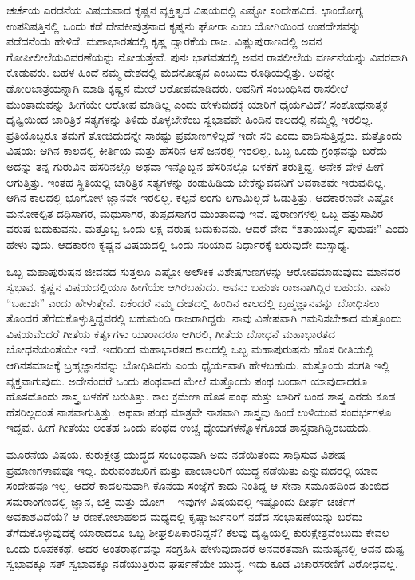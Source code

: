 \vskip 0.5cm

ಚರ್ಚೆಯ ಎರಡನೆಯ ವಿಷಯವಾದ ಕೃಷ್ಣನ ವ್ಯಕ್ತಿತ್ವದ ವಿಷಯದಲ್ಲಿ ಎಷ್ಟೋ ಸಂದೇಹವಿದೆ. ಛಾಂದೋಗ್ಯ ಉಪನಿಷತ್ತಿನಲ್ಲಿ ಒಂದು ಕಡೆ ದೇವಕೀಪುತ್ರನಾದ ಕೃಷ್ಣನು ಘೋರಾ ಎಂಬ ಯೋಗಿಯಿಂದ ಉಪದೇಶವನ್ನು ಪಡೆದನೆಂದು ಹೇಳಿದೆ. ಮಹಾ\-ಭಾರತದಲ್ಲಿ ಕೃಷ್ಣ ದ್ವಾರಕೆಯ ರಾಜ. ವಿಷ್ಣುಪುರಾಣದಲ್ಲಿ ಅವನ ಗೋಪೀಲೀಲೆಯ\break ವಿವರಣೆಯನ್ನು ನೋಡುತ್ತೇವೆ. ಪುನಃ ಭಾಗವತದಲ್ಲಿ ಅವನ ರಾಸಲೀಲೆಯ ವರ್ಣನೆಯನ್ನು ವಿವರವಾಗಿ ಕೊಡುವರು. ಬಹಳ ಹಿಂದೆ ನಮ್ಮ ದೇಶದಲ್ಲಿ ಮದನೋತ್ಸವ ಎಂಬುದು ರೂಢಿಯಲ್ಲಿತ್ತು. ಅದನ್ನೇ ಡೋಲಜಾತ್ರೆಯನ್ನಾಗಿ ಮಾಡಿ ಕೃಷ್ಣನ ಮೇಲೆ ಆರೋಪಮಾಡಿದರು. ಅವನಿಗೆ ಸಂಬಂಧಿಸಿದ ರಾಸಲೀಲೆ ಮುಂತಾದುವನ್ನು ಹೀಗೆಯೇ ಆರೋಪ ಮಾಡಿಲ್ಲ ಎಂದು ಹೇಳುವುದಕ್ಕೆ ಯಾರಿಗೆ ಧೈರ್ಯವಿದೆ? ಸಂಶೋಧನಾತ್ಮಕ ದೃಷ್ಟಿಯಿಂದ ಚಾರಿತ್ರಿಕ ಸತ್ಯಗಳನ್ನು ತಿಳಿದು ಕೊಳ್ಳಬೇಕೆಂಬ ಸ್ವಭಾವವೇ ಹಿಂದಿನ ಕಾಲದಲ್ಲಿ ನಮ್ಮಲ್ಲಿ ಇರಲಿಲ್ಲ. ಪ್ರತಿಯೊಬ್ಬರೂ ತಮಗೆ ತೋಚಿದುದನ್ನೇ ಸಾಕಷ್ಟು ಪ್ರಮಾಣಗಳಿಲ್ಲದೆ ಇದೇ ಸರಿ ಎಂದು ವಾದಿಸುತ್ತಿದ್ದರು. ಮತ್ತೊಂದು ವಿಷಯ: ಆಗಿನ ಕಾಲದಲ್ಲಿ ಕೀರ್ತಿಯ ಮತ್ತು ಹೆಸರಿನ ಆಸೆ ಜನರಲ್ಲಿ ಇರಲಿಲ್ಲ. ಒಬ್ಬ ಒಂದು ಗ್ರಂಥವನ್ನು ಬರೆದು ಅದನ್ನು ತನ್ನ ಗುರುವಿನ ಹೆಸರಿನಲ್ಲೊ ಅಥವಾ ಇನ್ನೊಬ್ಬನ ಹೆಸರಿನಲ್ಲೊ ಬಳಕೆಗೆ ತರುತ್ತಿದ್ದ. ಅನೇಕ ವೇಳೆ ಹೀಗೆ ಆಗುತ್ತಿತ್ತು. ಇಂತಹ ಸ್ಥಿತಿಯಲ್ಲಿ ಚಾರಿತ್ರಿಕ ಸತ್ಯಗಳನ್ನು ಕಂಡುಹಿಡಿಯ ಬೇಕೆನ್ನುವವನಿಗೆ ಅವಕಾಶವೇ ಇರುವುದಿಲ್ಲ. ಆಗಿನ ಕಾಲದಲ್ಲಿ ಭೂಗೋಳ ಜ್ಞಾನವೇ ಇರಲಿಲ್ಲ. ಕಲ್ಪನೆ ಲಂಗು ಲಗಾಮಿಲ್ಲದೆ ಓಡುತ್ತಿತ್ತು. ಆದಕಾರಣವೇ ಎಷ್ಟೋ ಮನೋಕಲ್ಪಿತ ದಧಿಸಾಗರ, ಮಧುಸಾಗರ, ತುಪ್ಪದಸಾಗರ ಮುಂತಾದವು ಇವೆ. ಪುರಾಣಗಳಲ್ಲಿ ಒಬ್ಬ ಹತ್ತುಸಾವಿರ ವರುಷ ಬದುಕುವನು. ಮತ್ತೊಬ್ಬ ಒಂದು ಲಕ್ಷ ವರುಷ ಬದುಕುವನು. ಆದರೆ ವೇದ “ಶತಾಯುರ್ವೈ ಪುರುಷಃ” ಎಂದು ಹೇಳು ವುದು. ಆದಕಾರಣ ಕೃಷ್ಣನ ವಿಷಯದಲ್ಲಿ ಒಂದು ಸರಿಯಾದ ನಿರ್ಧಾರಕ್ಕೆ ಬರುವುದೇ ದುಸ್ಸಾಧ್ಯ.

ಒಬ್ಬ ಮಹಾಪುರುಷನ ಜೀವನದ ಸುತ್ತಲೂ ಎಷ್ಟೋ ಅಲೌಕಿಕ ವಿಶೇಷಗುಣಗಳನ್ನು ಆರೋಪಮಾಡುವುದು ಮಾನವರ ಸ್ವಭಾವ. ಕೃಷ್ಣನ ವಿಷಯದಲ್ಲಿಯೂ ಹೀಗೆಯೇ ಆಗಿರಬಹುದು. ಅವನು ಬಹುಶಃ ರಾಜನಾಗಿದ್ದಿರ ಬಹುದು. ನಾನು “ಬಹುಶಃ” ಎಂದು ಹೇಳುತ್ತೇನೆ. ಏಕೆಂದರೆ ನಮ್ಮ ದೇಶದಲ್ಲಿ ಹಿಂದಿನ ಕಾಲದಲ್ಲಿ ಬ್ರಹ್ಮಜ್ಞಾನವನ್ನು ಬೋಧಿಸಲು ತೊಂದರೆ ತೆಗೆದುಕೊಳ್ಳುತ್ತಿದ್ದವರಲ್ಲಿ ಬಹುಮಂದಿ ರಾಜರಾಗಿದ್ದರು. ನಾವು ವಿಶೇಷವಾಗಿ ಗಮನಿಸಬೇಕಾದ ಮತ್ತೊಂದು ವಿಷಯವೆಂದರೆ ಗೀತೆಯ ಕರ್ತೃಗಳು ಯಾರಾದರೂ ಆಗಿರಲಿ, ಗೀತೆಯ ಬೋಧನೆ ಮಹಾಭಾರತದ ಬೋಧನೆಯಂತೆಯೇ ಇದೆ. ಇದರಿಂದ ಮಹಾಭಾರತದ ಕಾಲದಲ್ಲಿ ಒಬ್ಬ ಮಹಾಪುರುಷನು ಹೊಸ ರೀತಿಯಲ್ಲಿ ಆಗಿನ\break ಸಮಾಜಕ್ಕೆ ಬ್ರಹ್ಮಜ್ಞಾನವನ್ನು ಬೋಧಿಸಿದನು ಎಂದು ಧೈರ್ಯವಾಗಿ ಹೇಳಬಹುದು. ಮತ್ತೊಂದು ಸಂಗತಿ ಇಲ್ಲಿ ವ್ಯಕ್ತವಾಗುವುದು. ಅದೇನೆಂದರೆ ಒಂದು ಪಂಥವಾದ ಮೇಲೆ ಮತ್ತೊಂದು ಪಂಥ ಬಂದಾಗ ಯಾವುದಾದರೂ ಹೊಸದೊಂದು ಶಾಸ್ತ್ರ ಬಳಕೆಗೆ ಬರುತಿತ್ತು. ಕಾಲ ಕ್ರಮೇಣ ಹೊಸ ಪಂಥ ಮತ್ತು ಜಾರಿಗೆ ಬಂದ ಶಾಸ್ತ್ರ ಎರಡು ಕೂಡ ಹೆಸರಿಲ್ಲದಂತೆ ನಾಶವಾಗುತ್ತಿತ್ತು. ಅಥವಾ ಪಂಥ ಮಾತ್ರವೇ ನಾಶವಾಗಿ ಶಾಸ್ತ್ರವು ಹಿಂದೆ ಉಳಿಯುವ ಸಂದರ್ಭಗಳೂ ಇದ್ದವು. ಹೀಗೆ ಗೀತೆಯು ಅಂತಹ ಒಂದು ಪಂಥದ ಉಚ್ಚ ಧ್ಯೇಯಗಳನ್ನೊಳಗೊಂಡ ಶಾಸ್ತ್ರವಾಗಿದ್ದಿರಬಹುದು.

ಮೂರನೆಯ ವಿಷಯ. ಕುರುಕ್ಷೇತ್ರ ಯುದ್ಧದ ಸಂಬಂಧವಾಗಿ ಅದು ನಡೆಯಿತೆಂದು ಸಾಧಿಸುವ ವಿಶೇಷ ಪ್ರಮಾಣಗಳಾವುವೂ ಇಲ್ಲ. ಕುರುವಂಶಜರಿಗೆ ಮತ್ತು ಪಾಂಚಾಲರಿಗೆ ಯುದ್ಧ ನಡೆಯಿತು ಎನ್ನುವುದರಲ್ಲಿ ಯಾವ ಸಂದೇಹವೂ ಇಲ್ಲ. ಆದರೆ ಕಾದಲನುವಾಗಿ ಕೊನೆಯ ಸಂಜ್ಞೆಗೆ ಕಾದು ನಿಂತಿದ್ದ ಆ ಸೇನಾ ಸಮೂಹದಿಂದ ತುಂಬಿದ ಸಮರಾಂಗಣದಲ್ಲಿ ಜ್ಞಾನ, ಭಕ್ತಿ ಮತ್ತು ಯೋಗ – ಇವುಗಳ ವಿಷಯದಲ್ಲಿ ಇಷ್ಟೊಂದು ದೀರ್ಘ ಚರ್ಚೆಗೆ ಅವಕಾಶವಿದೆಯೆ? ಆ ರಣಕೋಲಾಹಲದ ಮಧ್ಯದಲ್ಲಿ ಕೃಷ್ಣಾರ್ಜುನರಿಗೆ ನಡೆದ ಸಂಭಾಷಣೆಯನ್ನು ಬರೆದು ತೆಗೆದುಕೊಳ್ಳುವುದಕ್ಕೆ ಯಾರಾದರೂ ಒಬ್ಬ ಶೀಘ್ರಲಿಪಿಕಾರನಿದ್ದನೆ? ಕೆಲವು ದೃಷ್ಟಿಯಲ್ಲಿ ಕುರುಕ್ಷೇತ್ರವೆಂಬುದು ಕೇವಲ ಒಂದು ರೂಪಕಕಥೆ. ಅದರ ಅಂತರಾರ್ಥವನ್ನು ಸಂಗ್ರಹಿಸಿ ಹೇಳುವುದಾದರೆ ಅನವರತವಾಗಿ ಮನುಷ್ಯನಲ್ಲಿ ಅವನ ದುಷ್ಟ ಸ್ವಭಾವಕ್ಕೂ ಸತ್​ ಸ್ವಭಾವಕ್ಕೂ ನಡೆಯುತ್ತಿರುವ ಘರ್ಷಣೆಯೇ ಯುದ್ಧ. ಇದು ಕೂಡ ವಿಚಾರಸರಣಿಗೆ ವಿರೋಧವಲ್ಲ.

